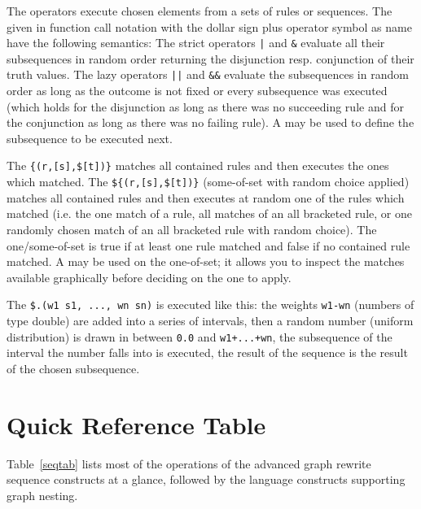 The  operators execute chosen elements from a sets of rules or sequences.
The  given in function call notation with the dollar sign plus operator symbol as name have the following semantics:
The strict operators \verb/|/ and \verb/&/ evaluate all their subsequences in random order returning the disjunction resp. conjunction of their truth values.
The lazy operators \verb/||/ and \verb/&&/ evaluate the subsequences in random order as long as the outcome is not fixed or every subsequence was executed 
(which holds for the disjunction as long as there was no succeeding rule and for the conjunction as long as there was no failing rule).
A  may be used to define the subsequence to be executed next.

The  \verb/{(r,[s],$[t])}/ matches all contained rules and then executes the ones which matched.
The  \verb/${(r,[s],$[t])}/ (some-of-set with random choice applied) matches all contained rules and then executes at random one of the rules which matched
(i.e. the one match of a rule, all matches of an all bracketed rule, or one randomly chosen match of an all bracketed rule with random choice).
The one/some-of-set is true if at least one rule matched and false if no contained rule matched.
A  may be used on the one-of-set; it allows you to inspect the matches available graphically before deciding on the one to apply. 

The  \verb/$.(w1 s1, ..., wn sn)/ is executed like this:
the weights \texttt{w1-wn} (numbers of type double) are added into a series of intervals,
then a random number (uniform distribution) is drawn in between \texttt{0.0} and \texttt{w1+...+wn},
the subsequence of the interval the number falls into is executed,
the result of the sequence is the result of the chosen subsequence.


\section{Quick Reference Table}

Table~\ref{seqtab} lists most of the operations of the advanced graph rewrite sequence constructs at a glance, followed by the language constructs supporting graph nesting.

